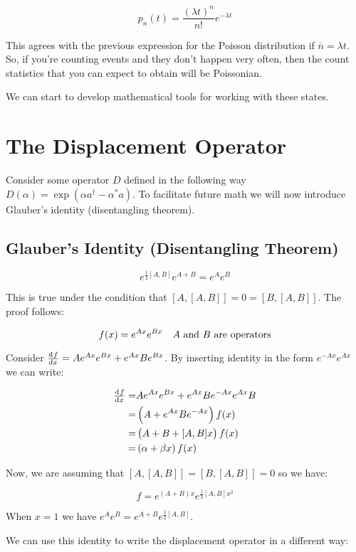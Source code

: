 \documentclass{article}
\begin{document}
\[
   p_n(t) = \frac{\left( \lambda t \right)^n}{n!} e^{-\lambda t}  
\]

This agrees with the previous expression for the Poisson distribution if
$\overline{n} = \lambda t$. So, if you're counting events and they don't happen
very often, then the count statistics that you can expect to obtain will be
Poissonian.

We can start to develop mathematical tools for working with these states.

\section{The Displacement Operator}

Consider some operator $ D $ defined in the following way $ D(\alpha) =
\exp(\alpha a^\dagger - \alpha^* a) $. To facilitate future math we will now
introduce Glauber's identity (disentangling theorem).

\subsection{Glauber's Identity (Disentangling Theorem)}
\[
   e^{\frac{1}{2}[A,B]} e^{A+B} = e^A e^B 
\]

This is true under the condition that $ [A,[A,B]] = 0 = [B,[A,B]] $. The proof
follows:

\[
   f(x) = e^{Ax} e^{Bx} \quad \text{$ A $ and $ B $ are operators}
\]

Consider $ \od{f}{x} = A e^{Ax} e^{Bx} + e^{Ax} B e^{Bx} $. By inserting
identity in the form $ e^{-Ax} e^{Ax} $ we can write:

\begin{align*}
   \od{f}{x} =& A e^{Ax} e^{Bx} + e^{Ax} B e^{-Ax} e^{Ax} B \\
   =& \left( A + e^{Ax} B e^{-Ax} \right) f(x) \\
   =&  \left( A + B + [A,B]x \right) f(x) \\
   =& \left( \alpha + \beta x \right) f(x)
\end{align*}

Now, we are assuming that $ [A,[A,B]] = [B,[A,B]] = 0 $ so we have:

\[
   f = e^{\left( A+B \right)x} e^{\frac{1}{2} [A,B]x^2}   
\]

When $ x = 1 $  we have $ e^{A}e^{B} = e^{A+B}e^{\frac{1}{2}[A,B]} $.

We can use this identity to write the displacement operator in a different way:
\end{document}
